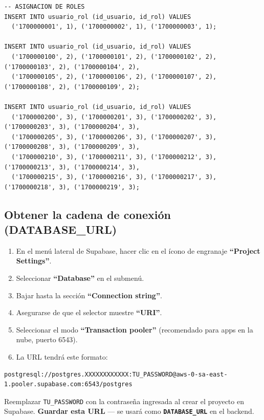\documentclass[12pt, a4paper]{article}
\newcommand{\cmd}[1]{\texttt{#1}}
\newcommand{\var}[1]{\texttt{\textbf{#1}}}
\begin{document}
\begin{lstlisting}[style=sql, caption={SEED --- datos de prueba. Contrasena de todos los usuarios: \texttt{Notas2026!}}]
-- ASIGNACION DE ROLES
INSERT INTO usuario_rol (id_usuario, id_rol) VALUES
  ('1700000001', 1), ('1700000002', 1), ('1700000003', 1);

INSERT INTO usuario_rol (id_usuario, id_rol) VALUES
  ('1700000100', 2), ('1700000101', 2), ('1700000102', 2), ('1700000103', 2), ('1700000104', 2),
  ('1700000105', 2), ('1700000106', 2), ('1700000107', 2), ('1700000108', 2), ('1700000109', 2);

INSERT INTO usuario_rol (id_usuario, id_rol) VALUES
  ('1700000200', 3), ('1700000201', 3), ('1700000202', 3), ('1700000203', 3), ('1700000204', 3),
  ('1700000205', 3), ('1700000206', 3), ('1700000207', 3), ('1700000208', 3), ('1700000209', 3),
  ('1700000210', 3), ('1700000211', 3), ('1700000212', 3), ('1700000213', 3), ('1700000214', 3),
  ('1700000215', 3), ('1700000216', 3), ('1700000217', 3), ('1700000218', 3), ('1700000219', 3);
\end{lstlisting}

\subsection{Obtener la cadena de conexión (DATABASE\_URL)}

\begin{enumerate}
    \item En el menú lateral de Supabase, hacer clic en el ícono de engranaje \textbf{``Project Settings''}.
    \item Seleccionar \textbf{``Database''} en el submenú.
    \item Bajar hasta la sección \textbf{``Connection string''}.
    \item Asegurarse de que el selector muestre \textbf{``URI''}.
    \item Seleccionar el modo \textbf{``Transaction pooler''} (recomendado para apps en la nube, puerto 6543).
    \item La URL tendrá este formato:
\end{enumerate}

\begin{lstlisting}[style=texto]
postgresql://postgres.XXXXXXXXXXXX:TU_PASSWORD@aws-0-sa-east-1.pooler.supabase.com:6543/postgres
\end{lstlisting}

\begin{importante}
    Reemplazar \cmd{TU\_PASSWORD} con la contraseña ingresada al crear el proyecto en Supabase. \textbf{Guardar esta URL} --- se usará como \var{DATABASE\_URL} en el backend.
\end{importante}
\end{document}
